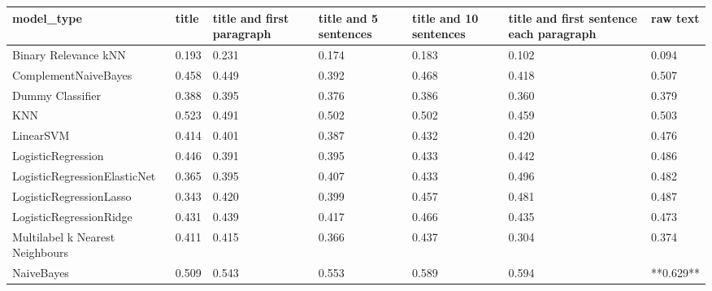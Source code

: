 \begin{tabular}{lllllll}
\toprule
                     model\_type & title & title and first paragraph & title and 5 sentences & title and 10 sentences & title and first sentence each paragraph &  raw text \\
\midrule
           Binary Relevance kNN & 0.193 &                     0.231 &                 0.174 &                  0.183 &                                   0.102 &     0.094 \\
           ComplementNaiveBayes & 0.458 &                     0.449 &                 0.392 &                  0.468 &                                   0.418 &     0.507 \\
               Dummy Classifier & 0.388 &                     0.395 &                 0.376 &                  0.386 &                                   0.360 &     0.379 \\
                            KNN & 0.523 &                     0.491 &                 0.502 &                  0.502 &                                   0.459 &     0.503 \\
                      LinearSVM & 0.414 &                     0.401 &                 0.387 &                  0.432 &                                   0.420 &     0.476 \\
             LogisticRegression & 0.446 &                     0.391 &                 0.395 &                  0.433 &                                   0.442 &     0.486 \\
   LogisticRegressionElasticNet & 0.365 &                     0.395 &                 0.407 &                  0.433 &                                   0.496 &     0.482 \\
        LogisticRegressionLasso & 0.343 &                     0.420 &                 0.399 &                  0.457 &                                   0.481 &     0.487 \\
        LogisticRegressionRidge & 0.431 &                     0.439 &                 0.417 &                  0.466 &                                   0.435 &     0.473 \\
Multilabel k Nearest Neighbours & 0.411 &                     0.415 &                 0.366 &                  0.437 &                                   0.304 &     0.374 \\
                     NaiveBayes & 0.509 &                     0.543 &                 0.553 &                  0.589 &                                   0.594 & **0.629** \\

\end{tabular}
